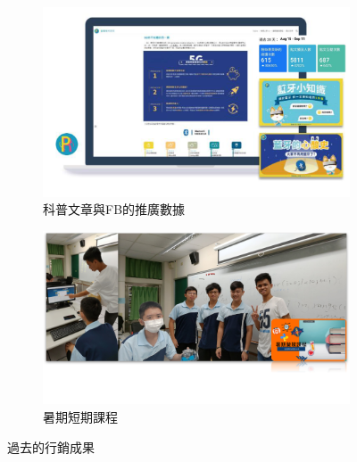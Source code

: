 \begin{enumerate}[label=(\arabic*)]
    \begin{figure}[H]
      \centering
      \begin{subfigure}{0.49\linewidth}
        \centering
        \includegraphics[width=1\textwidth]{images/article.png}
        \caption[科普文章]{科普文章與FB的推廣數據}
        \label{fig:article}
      \end{subfigure}
      \begin{subfigure}{0.49\linewidth}
        \centering
        \includegraphics[width=1\textwidth]{images/course-summer.png}
        \caption{暑期短期課程}
        \label{fig:course-summer}
      \end{subfigure}
      \caption[過去的行銷成果]{過去的行銷成果}
      \label{fig:marketing}
    \end{figure}


\end{enumerate}
